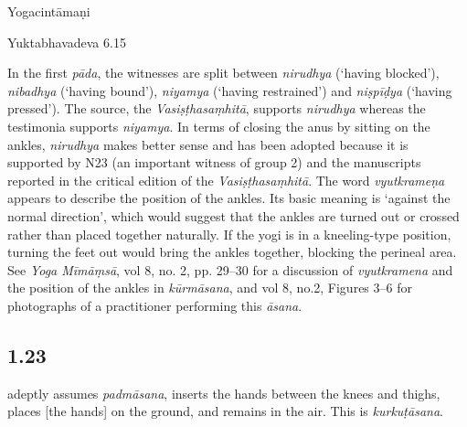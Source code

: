 \begin{ekdosis}
\begin{sources}[hp01_022]
\end{sources}

\begin{testimonia}[hp01_022]
Yogacintāmaṇi

\begin{versinnote}
\end{versinnote}

Yuktabhavadeva 6.15

\begin{versinnote}
\end{versinnote}

\end{testimonia}

\begin{philcomm}[hp01_022]   
In the first \emph{pāda}, the witnesses are split between \emph{nirudhya} (‘having blocked’), \emph{nibadhya} (‘having bound’), \emph{niyamya} (‘having restrained’) and \emph{niṣpīḍya} (‘having pressed’). The source, the \emph{Vasiṣṭhasaṃhitā}, supports \emph{nirudhya} whereas the testimonia supports \emph{niyamya}. In terms of closing the anus by sitting on the ankles, \emph{nirudhya} makes better sense and has been adopted because it is supported by N23 (an important witness of group 2) and the manuscripts reported in the critical edition of the \emph{Vasiṣṭhasaṃhitā}. The word \emph{vyutkrameṇa} appears to describe the position of the ankles. Its basic meaning is ‘against the normal direction’, which would suggest that the ankles are turned out or crossed rather than placed together naturally. If the yogi is in a kneeling-type position, turning the feet out would bring the ankles together, blocking the perineal area. See \emph{Yoga Mīmāṃsā}, vol 8, no. 2, pp. 29–30 for a discussion of \emph{vyutkramena} and the position of the ankles in \emph{kūrmāsana}, and vol 8, no.2, Figures 3–6 for photographs of a practitioner performing this \emph{āsana}. 
\end{philcomm}

\subsection*{1.23}
\begin{translation} adeptly assumes \emph{padmāsana}, inserts the hands between the knees and thighs, places [the hands] on the ground, and remains in the air. This is \emph{kurkuṭāsana}.
\end{translation}


\end{ekdosis}
